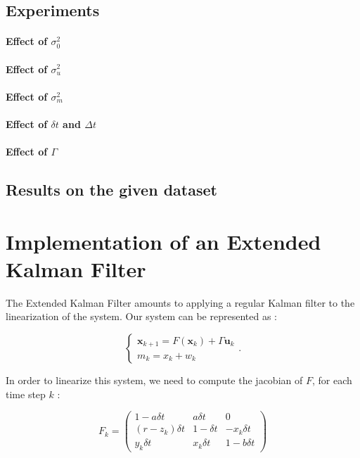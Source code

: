 \documentclass[english, DIV=13]{scrartcl}
\renewcommand{\vec}[1]{\mathbf{#1}}
\begin{document}
\FloatBarrier

\subsection{Experiments}
\paragraph{Effect of $\sigma^2_0$}
\paragraph{Effect of $\sigma^2_u$}
\paragraph{Effect of $\sigma^2_m$}
\paragraph{Effect of $\delta t$ and $\Delta t$}
\paragraph{Effect of $\Gamma$}

\subsection{Results on the given dataset}


\section{Implementation of an Extended Kalman Filter}

The Extended Kalman Filter amounts to applying a regular Kalman filter to the linearization of the system. Our system can be represented as :


\begin{equation*}
    \begin{cases}
        \vec{x}_{k+1} = F(\vec{x}_k) + \Gamma\vec{u}_k \\
        m_k = x_k + w_k
    \end{cases}.
\end{equation*}

In order to linearize this system, we need to compute the jacobian of $F$, for each time step $k$ :

\begin{equation*}
F_k = 
    \begin{pmatrix}
        1 - a \delta t & a \delta t & 0 \\
        (r - z_k) \delta t & 1 - \delta t & - x_k \delta t \\
        y_k \delta t & x_k \delta t & 1 - b \delta t
    \end{pmatrix}
\end{equation*}
\end{document}
